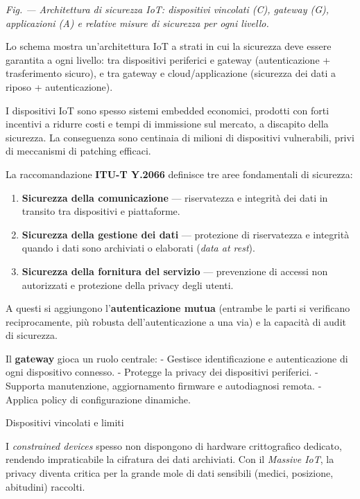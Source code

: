 \documentclass[
  italian,
  openany]{book}
\providecommand{\tightlist}{%
  \setlength{\itemsep}{0pt}\setlength{\parskip}{0pt}}
\begin{document}
\emph{Fig. --- Architettura di sicurezza IoT: dispositivi vincolati (C),
gateway (G), applicazioni (A) e relative misure di sicurezza per ogni
livello.}

Lo schema mostra un'architettura IoT a strati in cui la sicurezza deve
essere garantita a ogni livello: tra dispositivi periferici e gateway
(autenticazione + trasferimento sicuro), e tra gateway e
cloud/applicazione (sicurezza dei dati a riposo + autenticazione).

I dispositivi IoT sono spesso sistemi embedded economici, prodotti con
forti incentivi a ridurre costi e tempi di immissione sul mercato, a
discapito della sicurezza. La conseguenza sono centinaia di milioni di
dispositivi vulnerabili, privi di meccanismi di patching efficaci.

La raccomandazione \textbf{ITU-T Y.2066} definisce tre aree fondamentali
di sicurezza:

\begin{enumerate}
\def\labelenumi{\arabic{enumi}.}
\tightlist
\item
  \textbf{Sicurezza della comunicazione} --- riservatezza e integrità
  dei dati in transito tra dispositivi e piattaforme.
\item
  \textbf{Sicurezza della gestione dei dati} --- protezione di
  riservatezza e integrità quando i dati sono archiviati o elaborati
  (\emph{data at rest}).
\item
  \textbf{Sicurezza della fornitura del servizio} --- prevenzione di
  accessi non autorizzati e protezione della privacy degli utenti.
\end{enumerate}

A questi si aggiungono l'\textbf{autenticazione mutua} (entrambe le
parti si verificano reciprocamente, più robusta dell'autenticazione a
una via) e la capacità di audit di sicurezza.

Il \textbf{gateway} gioca un ruolo centrale: - Gestisce identificazione
e autenticazione di ogni dispositivo connesso. - Protegge la privacy dei
dispositivi periferici. - Supporta manutenzione, aggiornamento firmware
e autodiagnosi remota. - Applica policy di configurazione dinamiche.

\begin{calloutwarning}{Dispositivi vincolati e limiti}

I \emph{constrained devices} spesso non dispongono di hardware
crittografico dedicato, rendendo impraticabile la cifratura dei dati
archiviati. Con il \emph{Massive IoT}, la privacy diventa critica per la
grande mole di dati sensibili (medici, posizione, abitudini) raccolti.

\end{calloutwarning}
\end{document}
